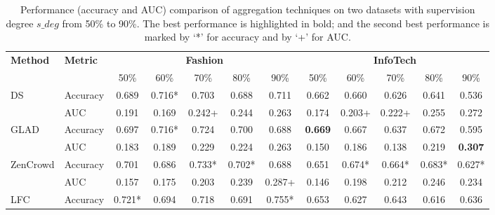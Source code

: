 \begin{table}[t]
\centering
\caption{Performance (accuracy and AUC) comparison of aggregation techniques on two datasets with supervision degree $s\_deg$ from 50\% to 90\%. The best performance is highlighted in bold; and the second best performance is marked by `*' for accuracy and by `+' for AUC.}\label{tab:comparision} 
\begin{tabular}{ll|ccccc|ccccc}
\toprule
\multirow{2}{*}{\textbf{Method}}  &   \multirow{2}{*}{\textbf{Metric}}  & \multicolumn{5}{|c|}{\textbf{Fashion}}      & \multicolumn{5}{c}{\textbf{InfoTech}}  \\ \cline{3-12}
 & &   50\%           & 60\%           & 70\%           & 80\%           & 90\%           & 50\%           & 60\%           & 70\%           & 80\%           & 90\%           \\ \midrule
\multirow{2}{*}{DS}          & Accuracy     & 0.689          & 0.716*         & 0.703          & 0.688          & 0.711         & 0.662          & 0.660          & 0.626          & 0.641          & 0.536          \\ %
                             & AUC   & 0.191          & 0.169          & 0.242+          & 0.244          & 0.263          & 0.174          & 0.203+         & 0.222+         & 0.255          & 0.272          \\ \hline
\multirow{2}{*}{GLAD}        & Accuracy     & 0.697          & 0.716*         & 0.724          & 0.700          & 0.688          & \textbf{0.669}        & 0.667          & 0.637          & 0.672          & 0.595          \\ %
                             & AUC   & 0.183          & 0.189          & 0.229          & 0.224          & 0.263          & 0.150          & 0.186          & 0.138          & 0.219          & \textbf{0.307}         \\ \hline
\multirow{2}{*}{ZenCrowd}                           & Accuracy     & 0.701          & 0.686          & 0.733* & 0.702*         & 0.688          & 0.651          & 0.674*         & 0.664* & 0.683* & 0.627*         \\ %
                             & AUC   & 0.157          & 0.175          & 0.203         & 0.239          & 0.287+         & 0.146          & 0.198          & 0.212          & 0.246          & 0.234          \\ \hline
\multirow{2}{*}{LFC}         & Accuracy     & 0.721*         & 0.694          & 0.718          & 0.691          & 0.755*          & 0.653          & 0.627          & 0.643          & 0.616          & 0.636          \\ %

\end{tabular}
\end{table}
